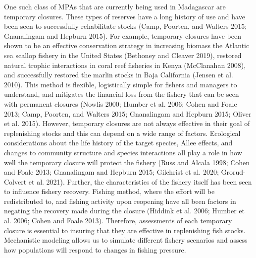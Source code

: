 \documentclass[
]{article}
\begin{document}
One such class of MPAs that are currently being used in Madagascar are temporary closures. These types of reserves have a long history of use and have been seen to successfully rehabilitate stocks (Camp, Poorten, and Walters 2015; Gnanalingam and Hepburn 2015). For example, temporary closures have been shown to be an effective conservation strategy in increasing biomass the Atlantic sea scallop fishery in the United States (Bethoney and Cleaver 2019), restored natural trophic interactions in coral reef fisheries in Kenya (McClanahan 2008), and successfully restored the marlin stocks in Baja California (Jensen et al. 2010). This method is flexible, logistically simple for fishers and managers to understand, and mitigates the financial loss from the fishery that can be seen with permanent closures (Nowlis 2000; Humber et al. 2006; Cohen and Foale 2013; Camp, Poorten, and Walters 2015; Gnanalingam and Hepburn 2015; Oliver et al. 2015). However, temporary closures are not always effective in their goal of replenishing stocks and this can depend on a wide range of factors. Ecological considerations about the life history of the target species, Allee effects, and changes to community structure and species interactions all play a role in how well the temporary closure will protect the fishery (Russ and Alcala 1998; Cohen and Foale 2013; Gnanalingam and Hepburn 2015; Gilchrist et al. 2020; Grorud-Colvert et al. 2021). Further, the characteristics of the fishery itself has been seen to influence fishery recovery. Fishing method, where the effort will be redistributed to, and fishing activity upon reopening have all been factors in negating the recovery made during the closure (Hiddink et al. 2006; Humber et al. 2006; Cohen and Foale 2013). Therefore, assessments of each temporary closure is essential to insuring that they are effective in replenishing fish stocks. Mechanistic modeling allows us to simulate different fishery scenarios and assess how populations will respond to changes in fishing pressure.
\end{document}
